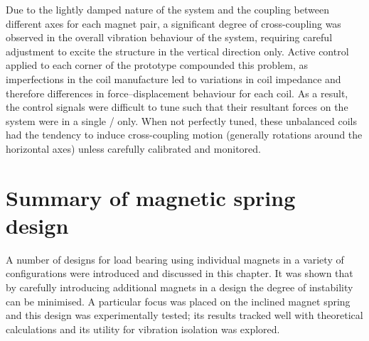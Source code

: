 \documentclass[11pt,a4paper]{memoir}
\begin{document}
Due to the lightly damped nature of the system and the coupling between different axes for each magnet pair, a significant degree of cross-coupling was observed in the overall vibration behaviour of the system, requiring careful adjustment to excite the structure in the vertical direction only.
Active control applied to each corner of the prototype compounded this problem, as imperfections in the coil manufacture led to variations in coil impedance and therefore differences in force--displacement behaviour for each coil.
As a result, the control signals were difficult to tune such that their resultant forces on the system were in a single \dof/ only.
When not perfectly tuned, these unbalanced coils had the tendency to induce cross-coupling motion (generally rotations around the horizontal axes) unless carefully calibrated and monitored.

\section{Summary of magnetic spring design}

A number of designs for load bearing using individual magnets in a variety of configurations were introduced and discussed in this chapter.
It was shown that by carefully introducing additional magnets in a design the degree of instability can be minimised.
A particular focus was placed on the inclined magnet spring and this design was experimentally tested; its results tracked well with theoretical calculations and its utility for vibration isolation was explored.
\end{document}
